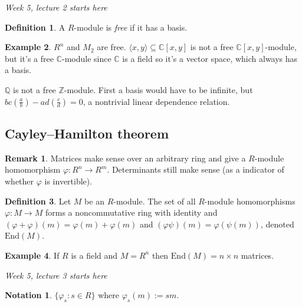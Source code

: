 \documentclass[a4paper]{article}
\newcommand{\la}{\langle}
\newcommand{\ra}{\rangle}
\newcommand{\Z}{\mathbb Z}
\newcommand{\Q}{\mathbb Q}
\newcommand{\C}{\mathbb C}
\newcommand{\End}{\text{End}}
\theoremstyle{definition}
\newtheorem{defn}{Definition}[subsection]
\newtheorem{example}[defn]{Example}
\newtheorem*{remark}{Remark}
\newtheorem*{notation}{Notation}
\begin{document}
\begin{flushright}
\textit{Week 5, lecture 2 starts here}
\end{flushright}

\begin{defn}
A $R$-module is \textit{free} if it has a basis.
\end{defn}
\begin{example}
$R^n$ and $M_2$ are free. $\la x,y\ra \subseteq \C[x,y]$ is not a free $\C[x,y]$-module, but it's a free $\C$-module since $\C$ is a field so it's a vector space, which always has a basis.

$\Q$ is not a free $\Z$-module. First a basis would have to be infinite, but $bc\left(\frac{a}{b}\right)-ad\left(\frac{c}{d}\right)=0$, a nontrivial linear dependence relation.
\end{example}

\subsection{Cayley–Hamilton theorem}
\begin{remark}
Matrices make sense over an arbitrary ring and give a $R$-module homomorphism $\varphi:R^n\rightarrow R^m$. Determinants still make sense (as a indicator of whether $\varphi$ is invertible).
\end{remark}

\begin{defn}
Let $M$ be an $R$-module. The set of all $R$-module homomorphisms $\varphi:M\rightarrow M$ forms a noncommutative ring with identity and $(\varphi+\varphi)(m)=\varphi(m)+\varphi(m)$ and $(\varphi\psi)(m)=\varphi(\psi(m))$, denoted $\End(M)$.
\end{defn}
\begin{example}
If $R$ is a field and $M=R^n$ then $\End(M)=n\times n$ matrices.
\end{example}

\begin{flushright}
\textit{Week 5, lecture 3 starts here}
\end{flushright}

\begin{notation}
$\{\varphi_s:s\in R\}$ where $\varphi_s(m):=sm$.
\end{notation}
\end{document}
